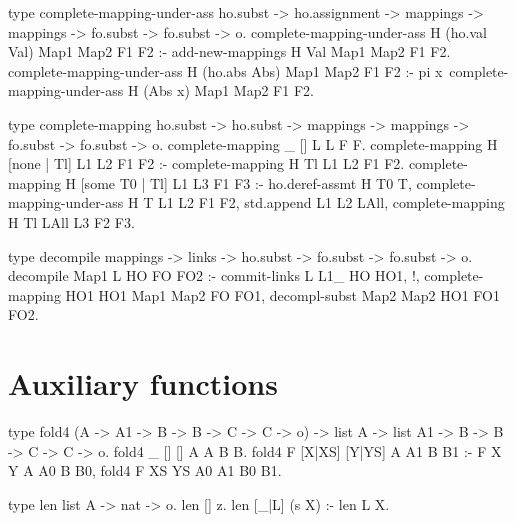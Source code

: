 \begin{elpicode}
  type complete-mapping-under-ass ho.subst -> ho.assignment -> 
    mappings -> mappings ->  fo.subst -> fo.subst -> o.
  complete-mapping-under-ass H (ho.val Val) Map1 Map2 F1 F2 :- 
    add-new-mappings H Val Map1 Map2 F1 F2.
  complete-mapping-under-ass H (ho.abs Abs) Map1 Map2 F1 F2 :- 
    pi x\ complete-mapping-under-ass H (Abs x) Map1 Map2 F1 F2.

  type complete-mapping ho.subst -> ho.subst ->   
    mappings -> mappings -> fo.subst -> fo.subst -> o.
  complete-mapping _ [] L L F F.
  complete-mapping H [none | Tl] L1 L2 F1 F2 :-   
    complete-mapping H Tl L1 L2 F1 F2.
  complete-mapping H [some T0 | Tl] L1 L3 F1 F3 :-
    ho.deref-assmt H T0 T,
    complete-mapping-under-ass H T L1 L2 F1 F2, 
    std.append L1 L2 LAll,
    complete-mapping H Tl LAll L3 F2 F3.

  type decompile mappings -> links -> ho.subst -> 
    fo.subst -> fo.subst -> o.
  decompile Map1 L HO FO FO2 :- 
    commit-links L L1_ HO HO1, !,
    complete-mapping HO1 HO1 Map1 Map2 FO FO1,
    decompl-subst Map2 Map2 HO1 FO1 FO2.
\end{elpicode}

\section{Auxiliary functions}

\begin{elpicode}
  type fold4 (A -> A1 -> B -> B -> C -> C -> o) -> list A -> 
    list A1 -> B -> B -> C -> C -> o.
  fold4 _ [] [] A A B B.
  fold4 F [X|XS] [Y|YS] A A1 B B1 :- F X Y A A0 B B0, 
    fold4 F XS YS A0 A1 B0 B1.
  
  type len list A -> nat -> o.
  len [] z.
  len [_|L] (s X) :- len L X.
  
  \end{elpicode}
  